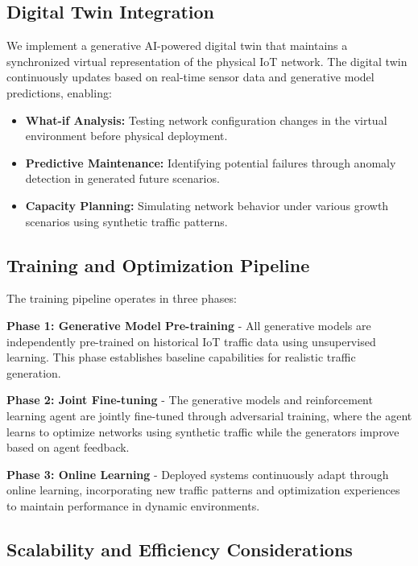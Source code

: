\documentclass[conference]{IEEEtran}
\begin{document}
\subsection{Digital Twin Integration}

We implement a generative AI-powered digital twin that maintains a synchronized virtual representation of the physical IoT network. The digital twin continuously updates based on real-time sensor data and generative model predictions, enabling:

\begin{itemize}
\item \textbf{What-if Analysis:} Testing network configuration changes in the virtual environment before physical deployment.
\item \textbf{Predictive Maintenance:} Identifying potential failures through anomaly detection in generated future scenarios.
\item \textbf{Capacity Planning:} Simulating network behavior under various growth scenarios using synthetic traffic patterns.
\end{itemize}

\subsection{Training and Optimization Pipeline}

The training pipeline operates in three phases:

\textbf{Phase 1: Generative Model Pre-training} - All generative models are independently pre-trained on historical IoT traffic data using unsupervised learning. This phase establishes baseline capabilities for realistic traffic generation.

\textbf{Phase 2: Joint Fine-tuning} - The generative models and reinforcement learning agent are jointly fine-tuned through adversarial training, where the agent learns to optimize networks using synthetic traffic while the generators improve based on agent feedback.

\textbf{Phase 3: Online Learning} - Deployed systems continuously adapt through online learning, incorporating new traffic patterns and optimization experiences to maintain performance in dynamic environments.

\subsection{Scalability and Efficiency Considerations}
\end{document}
